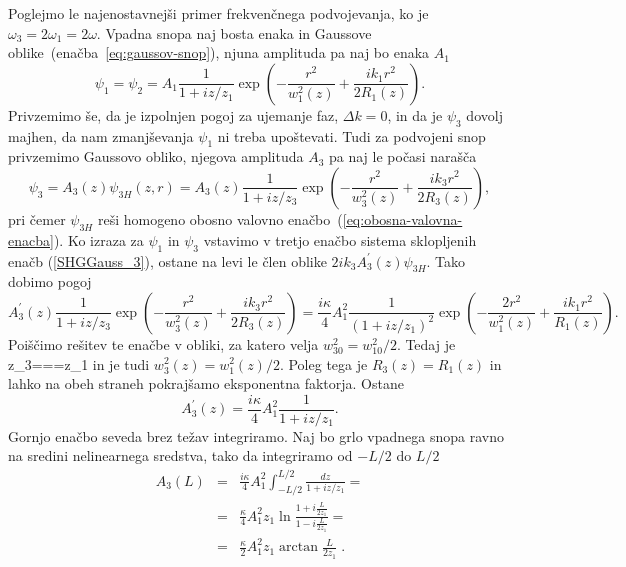 Poglejmo le najenostavnejši primer frekvenčnega podvojevanja, ko je 
$\omega_{3}=2\omega_{1}=2\omega$.
Vpadna snopa naj bosta enaka in Gaussove oblike~(enačba~\ref{eq:gaussov-snop}), 
njuna amplituda pa naj bo enaka $A_1$
\begin{equation}
\psi_{1} = \psi_2 = A_{1}\frac{1}{1+iz/z_1}
\exp\left(-\frac{r^{2}}{w_1^{2}(z)}+\frac{ik_1r^{2}}{2R_1(z)}\right).
\label{8.21}
\end{equation}
Privzemimo še, da je izpolnjen pogoj za ujemanje faz, $\Delta k=0$,
in da je $\psi_{3}$ dovolj majhen, da nam zmanjševanja $\psi_{1}$
ni treba upoštevati. Tudi za podvojeni snop privzemimo Gaussovo 
obliko, njegova amplituda $A_3$ pa naj le počasi narašča
\begin{equation}
\psi_{3}=A_{3}(z)\psi_{3H}(z,r)=A_{3}(z)\frac{1}{1+iz/z_{3}}
\exp\left(-\frac{r^{2}}{w_{3}^{2}(z)}+\frac{ik_{3}r^{2}}{2R_{3}(z)}\right),
\label{8.22}
\end{equation}
pri čemer $\psi_{3H}$ reši homogeno obosno valovno 
enačbo~(\ref{eq:obosna-valovna-enacba}). Ko izraza za $\psi_{1}$
in $\psi_{3}$ vstavimo v tretjo enačbo sistema sklopljenih enačb (\ref{SHGGauss_3}),
ostane na levi le člen oblike $2ik_{3}A_{3}^{\prime}(z)\psi_{3H}$. Tako dobimo pogoj
\begin{equation}
A_{3}^{\prime}(z)\frac{1}{1+iz/z_3}\exp\left(-\frac{r^{2}}{w_{3}^{2}(z)}+\frac{ik_{3}r^{2}}
{2R_{3}(z)}\right)=
\frac{i\kappa}{4}A_{1}^{2}\frac{1}{(1+iz/z_{1})^{2}}\exp\left(-\frac{2r^{2}}
{w_{1}^{2}(z)}+\frac{ik_{1}r^{2}}{R_{1}(z)}\right).
\label{8.23}
\end{equation}
Poiščimo rešitev te enačbe v obliki, za katero velja $w_{30}^{2}=w_{10}^{2}/2$. Tedaj je 
\beq
z_{3}===z_{1}
\eeq
in je tudi $w_{3}^{2}(z)=w_{1}^{2}(z)/2$. Poleg tega je $R_{3}(z)=R_{1}(z)$
in lahko na obeh straneh pokrajšamo eksponentna faktorja. Ostane 
\begin{equation}
A_{3}^{\prime}(z)=\frac{i\kappa}{4}A_{1}^{2}\frac{1}{1+iz/z_1}.
\label{8.24}
\end{equation}
Gornjo enačbo seveda brez težav integriramo. Naj bo grlo vpadnega
snopa ravno na sredini nelinearnega sredstva, tako da integriramo
od $-L/2$ do $L/2$
\begin{eqnarray}
A_{3}(L) & = & \frac{i\kappa}{4}A_{1}^{2}\int_{-L/2}^{L/2}\frac{dz}{1+iz/z_1} = \nonumber \\
 & = & \frac{\kappa}{4}A_{1}^{2}z_{1}\ln\frac{1+i\frac{L}{2z_{1}}}{1-i\frac{L}{2z_{1}}}= \nonumber \\
 & = & \frac{\kappa}{2}A_{1}^{2}z_{1}\arctan\frac{L}{2z_{1}}\;.
\end{eqnarray}
